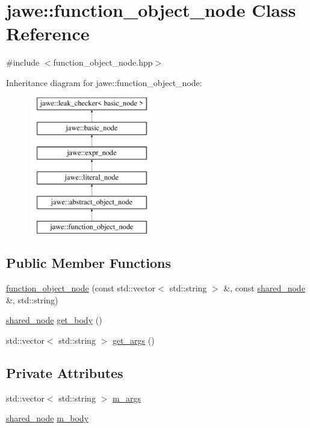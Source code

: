 \hypertarget{classjawe_1_1function__object__node}{}\section{jawe\+:\+:function\+\_\+object\+\_\+node Class Reference}
\label{classjawe_1_1function__object__node}


{\ttfamily \#include $<$function\+\_\+object\+\_\+node.\+hpp$>$}

Inheritance diagram for jawe\+:\+:function\+\_\+object\+\_\+node\+:\begin{figure}[H]
\begin{center}
\leavevmode
\includegraphics[height=6.000000cm]{classjawe_1_1function__object__node}
\end{center}
\end{figure}
\subsection*{Public Member Functions}
\begin{DoxyCompactItemize}
\item 
\hyperlink{classjawe_1_1function__object__node_ae7bff56873ee72d59fd2aa248c6af950}{function\+\_\+object\+\_\+node} (const std\+::vector$<$ std\+::string $>$ \&, const \hyperlink{namespacejawe_a3f307481d921b6cbb50cc8511fc2b544}{shared\+\_\+node} \&, std\+::string)
\item 
\hyperlink{namespacejawe_a3f307481d921b6cbb50cc8511fc2b544}{shared\+\_\+node} \hyperlink{classjawe_1_1function__object__node_aa8c0d3afcc6aaf08fc4b1849a8858299}{get\+\_\+body} ()
\item 
std\+::vector$<$ std\+::string $>$ \hyperlink{classjawe_1_1function__object__node_a70cac84994ab03b0bf6738b5916ccb0a}{get\+\_\+args} ()
\end{DoxyCompactItemize}
\subsection*{Private Attributes}
\begin{DoxyCompactItemize}
\item 
std\+::vector$<$ std\+::string $>$ \hyperlink{classjawe_1_1function__object__node_a1ae62495879cfec59334e976286b3e50}{m\+\_\+args}
\item 
\hyperlink{namespacejawe_a3f307481d921b6cbb50cc8511fc2b544}{shared\+\_\+node} \hyperlink{classjawe_1_1function__object__node_a9902f571f4149af4cf41034c14209005}{m\+\_\+body}
\end{DoxyCompactItemize}
